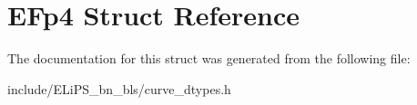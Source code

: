 \hypertarget{struct_e_fp4}{}\section{E\+Fp4 Struct Reference}
\label{struct_e_fp4}


The documentation for this struct was generated from the following file\+:\begin{DoxyCompactItemize}
\item 
include/\+E\+Li\+P\+S\+\_\+bn\+\_\+bls/curve\+\_\+dtypes.\+h\end{DoxyCompactItemize}

